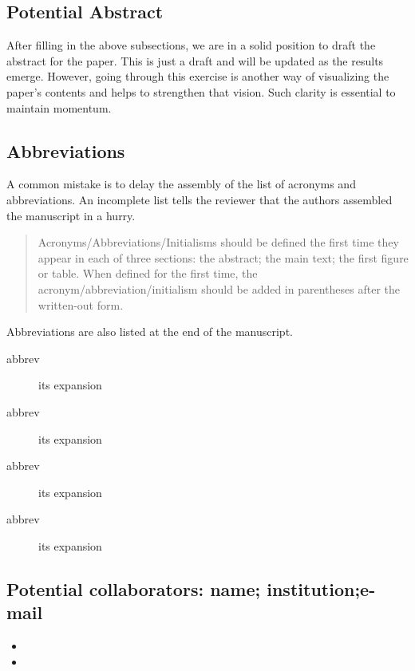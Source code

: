 \documentclass[10pt,letterpaper]{article}
\newcommand{\bi}{\begin{itemize}}
\newcommand{\ei}{\end{itemize}}
\begin{document}
\subsection*{Potential Abstract}

After filling in the above subsections, we are in a solid position to draft the abstract for the paper.
This is just a draft and will be updated as the results emerge.
However, going through this exercise is another way of visualizing the paper's contents and helps to strengthen that vision.
Such clarity is essential to maintain momentum.



\subsection{Abbreviations}
\label{sub:abbrev}

A common mistake is to delay the assembly of the list of acronyms and abbreviations.
An incomplete list tells the reviewer that the authors assembled the manuscript in a hurry.


\begin{quote}
   Acronyms/Abbreviations/Initialisms should be defined the first time they appear in each of three sections: the abstract; the main text; the first figure or table. When defined for the first time, the acronym/abbreviation/initialism should be added in parentheses after the written-out form.
\end{quote}

Abbreviations are also listed at the end of the manuscript.

\begin{description}
    \item[abbrev] its expansion 
    \item[abbrev] its expansion 
    \item[abbrev] its expansion 
    \item[abbrev] its expansion 
\end{description}



\subsection{Potential collaborators: name; institution;e-mail}
\label{sub:collaborators}

\bi
\item 
\item
\ei
\end{document}

